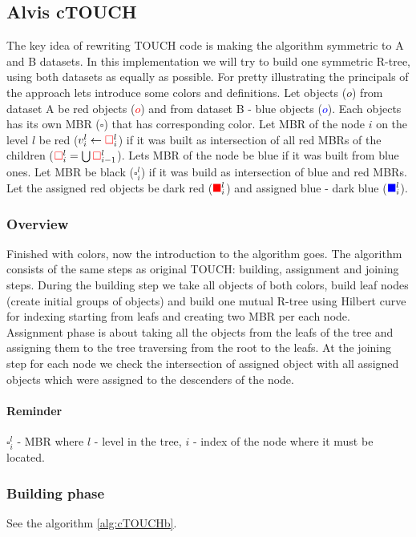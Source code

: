 \documentclass{vldb}
\newcommand{\cSJ}{cTOUCH}
\begin{document}
\subsection{Alvis {\cSJ}}
The key idea of rewriting TOUCH code is making the algorithm symmetric to A and B datasets. In this implementation we will try to build one symmetric R-tree, using both datasets as equally as possible. For pretty illustrating the principals of the approach lets introduce some colors and definitions. Let objects ($o$) from dataset A be red objects (\textcolor{red}{$o$}) and from dataset B - blue objects (\textcolor{blue}{$o$}). Each objects has its own MBR ($ \square $) that has corresponding color. Let MBR of the node $i$ on the level $l$ be red ($v^l_i \leftarrow \textcolor{red}{\square}^l_i$) if it was built as intersection of all red MBRs of the children ($\textcolor{red}{\square}^{l}_i = \bigcup\textcolor{red}{\square}^{l}_{i-1}$). Lets MBR of the node be blue if it was built from blue ones. Let MBR be black ($\square^{l}_i$) if it was build as intersection of blue and red MBRs. Let the assigned red objects be dark red ($\textcolor{red}{\blacksquare}^{l}_i$) and assigned blue - dark blue ($\textcolor{blue}{\blacksquare}^{l}_i$).

\subsubsection{Overview}Finished with colors, now the introduction to the algorithm goes. The algorithm consists of the same steps as original TOUCH: building, assignment and joining steps. During the building step we take all objects of both colors, build leaf nodes (create initial groups of objects) and build one mutual R-tree using Hilbert curve for indexing starting from leafs and creating two MBR per each node. Assignment phase is about taking all the objects from the leafs of the tree and assigning them to the tree traversing from the root to the leafs. At the joining step for each node we check the intersection of assigned object with all assigned objects which were assigned to the descenders of the node.

\paragraph{Reminder} $\square^{l}_i$ - MBR where $l$ - level in the tree, $i$ - index of the node where it must be located.

\subsubsection{Building phase}
See the algorithm \ref{alg:cTOUCHb}.
\end{document}
